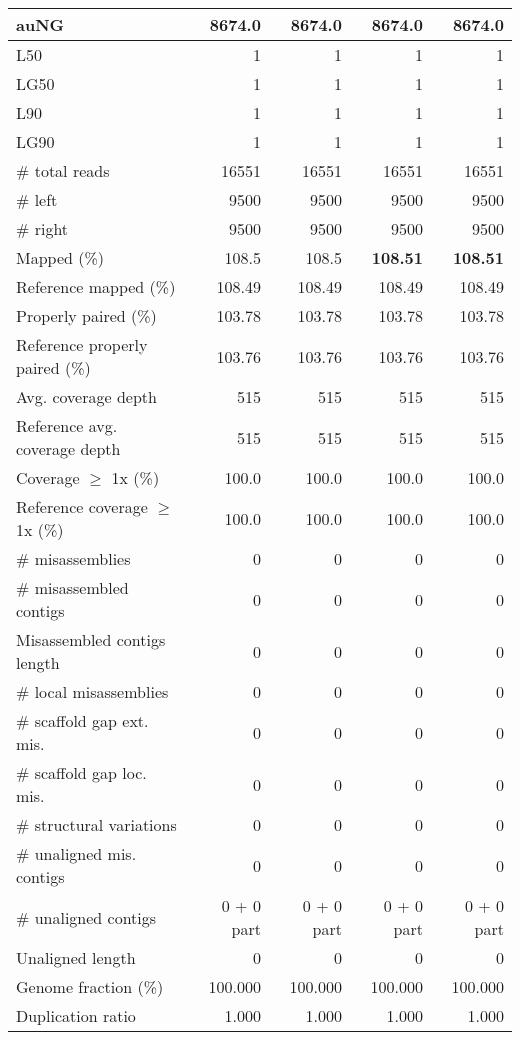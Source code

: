 \documentclass[12pt,a4paper]{article}
\begin{document}
\begin{table}[ht]
\begin{center}
\begin{tabular}{|l*{4}{|r}|}
auNG & 8674.0 & 8674.0 & 8674.0 & 8674.0 \\ \hline
L50 & 1 & 1 & 1 & 1 \\ \hline
LG50 & 1 & 1 & 1 & 1 \\ \hline
L90 & 1 & 1 & 1 & 1 \\ \hline
LG90 & 1 & 1 & 1 & 1 \\ \hline
\# total reads & 16551 & 16551 & 16551 & 16551 \\ \hline
\# left & 9500 & 9500 & 9500 & 9500 \\ \hline
\# right & 9500 & 9500 & 9500 & 9500 \\ \hline
Mapped (\%) & 108.5 & 108.5 & {\bf 108.51} & {\bf 108.51} \\ \hline
Reference mapped (\%) & 108.49 & 108.49 & 108.49 & 108.49 \\ \hline
Properly paired (\%) & 103.78 & 103.78 & 103.78 & 103.78 \\ \hline
Reference properly paired (\%) & 103.76 & 103.76 & 103.76 & 103.76 \\ \hline
Avg. coverage depth & 515 & 515 & 515 & 515 \\ \hline
Reference avg. coverage depth & 515 & 515 & 515 & 515 \\ \hline
Coverage $\geq$ 1x (\%) & 100.0 & 100.0 & 100.0 & 100.0 \\ \hline
Reference coverage $\geq$ 1x (\%) & 100.0 & 100.0 & 100.0 & 100.0 \\ \hline
\# misassemblies & 0 & 0 & 0 & 0 \\ \hline
\# misassembled contigs & 0 & 0 & 0 & 0 \\ \hline
Misassembled contigs length & 0 & 0 & 0 & 0 \\ \hline
\# local misassemblies & 0 & 0 & 0 & 0 \\ \hline
\# scaffold gap ext. mis. & 0 & 0 & 0 & 0 \\ \hline
\# scaffold gap loc. mis. & 0 & 0 & 0 & 0 \\ \hline
\# structural variations & 0 & 0 & 0 & 0 \\ \hline
\# unaligned mis. contigs & 0 & 0 & 0 & 0 \\ \hline
\# unaligned contigs & 0 + 0 part & 0 + 0 part & 0 + 0 part & 0 + 0 part \\ \hline
Unaligned length & 0 & 0 & 0 & 0 \\ \hline
Genome fraction (\%) & 100.000 & 100.000 & 100.000 & 100.000 \\ \hline
Duplication ratio & 1.000 & 1.000 & 1.000 & 1.000 \\ \hline

\end{tabular}
\end{center}
\end{table}
\end{document}
